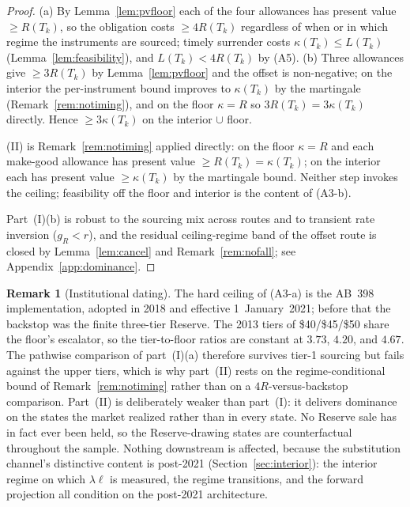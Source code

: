 \documentclass[11pt,letterpaper]{article}
\theoremstyle{plain}
\theoremstyle{definition}
\newtheorem{remark}[theorem]{Remark}
\numberwithin{equation}{section}
\begin{document}
\begin{proof}
(a) By Lemma~\ref{lem:pvfloor} each of the four allowances has present value $\ge R(T_k)$, so the obligation costs $\ge 4R(T_k)$ regardless of when or in which regime the instruments are sourced; timely surrender costs $\kappa(T_k)\le L(T_k)$ (Lemma~\ref{lem:feasibility}), and $L(T_k)<4R(T_k)$ by (A5). (b) Three allowances give $\ge 3R(T_k)$ by Lemma~\ref{lem:pvfloor} and the offset is non-negative; on the interior the per-instrument bound improves to $\kappa(T_k)$ by the martingale (Remark~\ref{rem:notiming}), and on the floor $\kappa=R$ so $3R(T_k)=3\kappa(T_k)$ directly. Hence $\ge 3\kappa(T_k)$ on the interior $\cup$ floor.

(II) is Remark~\ref{rem:notiming} applied directly: on the floor $\kappa=R$ and each make-good allowance has present value $\ge R(T_k)=\kappa(T_k)$; on the interior each has present value $\ge\kappa(T_k)$ by the martingale bound. Neither step invokes the ceiling; feasibility off the floor and interior is the content of (A3-b).

Part~(I)(b) is robust to the sourcing mix across routes and to transient rate inversion ($g_R<r$), and the residual ceiling-regime band of the offset route is closed by Lemma~\ref{lem:cancel} and Remark~\ref{rem:nofall}; see Appendix~\ref{app:dominance}.
\end{proof}

\begin{remark}[Institutional dating]\label{rem:dating}
The hard ceiling of (A3-a) is the AB~398 implementation, adopted in 2018 and effective 1~January~2021; before that the backstop was the finite three-tier Reserve. The 2013 tiers of \$40/\$45/\$50 share the floor's escalator, so the tier-to-floor ratios are constant at $3.73$, $4.20$, and $4.67$. The pathwise comparison of part~(I)(a) therefore survives tier-1 sourcing but fails against the upper tiers, which is why part~(II) rests on the regime-conditional bound of Remark~\ref{rem:notiming} rather than on a $4R$-versus-backstop comparison. Part~(II) is deliberately weaker than part~(I): it delivers dominance on the states the market realized rather than in every state. No Reserve sale has in fact ever been held, so the Reserve-drawing states are counterfactual throughout the sample. Nothing downstream is affected, because the substitution channel's distinctive content is post-2021 (Section~\ref{sec:interior}): the interior regime on which $\lambda\ell$ is measured, the regime transitions, and the forward projection all condition on the post-2021 architecture.
\end{remark}
\end{document}
